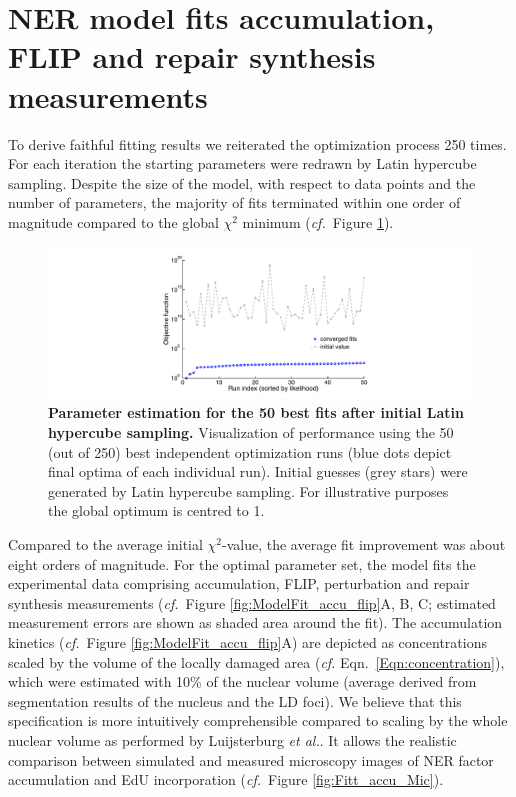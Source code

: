 \newpage



\section{NER model fits accumulation, FLIP and repair synthesis measurements}    

To derive faithful fitting results we reiterated the optimization process 250 times. For each iteration the starting parameters were redrawn by Latin hypercube sampling. Despite the size of the model, with respect to data points and the number of parameters, the majority of fits terminated within one order of magnitude compared to the global $\chi^{2}$ minimum (\textit{cf.}\ Figure \ref{fig:LHS}).
\begin{figure}[b!]
	\begin{center}
		\includegraphics[width=1\textwidth]{Abbildungen/figure2_6_4.pdf}
		\caption{\textbf{Parameter estimation for the 50 best fits after initial Latin hypercube sampling.} Visualization of performance using the 50 (out of 250) best independent optimization runs (blue dots depict final optima of each individual run). Initial guesses (grey stars) were generated by Latin hypercube sampling. For illustrative purposes the global optimum is centred to 1.}
		\label{fig:LHS}
	\end{center}
\end{figure} 

Compared to the average initial $\chi^{2}$-value, the average fit improvement was about eight orders of magnitude. For the optimal parameter set, the model fits the experimental data comprising accumulation, FLIP, perturbation and repair synthesis measurements (\textit{cf.}\ Figure \ref{fig:ModelFit_accu_flip}A, B, C; estimated measurement errors are shown as shaded area around the fit). The accumulation kinetics (\textit{cf.}\ Figure \ref{fig:ModelFit_accu_flip}A) are depicted as concentrations scaled by the volume of the locally damaged area (\textit{cf.} Eqn.\ \ref{Eqn:concentration}), which were estimated with 10\% \label{sec:LD_volume} of the nuclear volume (average derived from segmentation results of the nucleus and the LD foci). We believe that this specification is more intuitively comprehensible  compared to scaling by the whole nuclear volume as performed by Luijsterburg \textit{et al.}\cite{Luijsterburg2010}. It allows the realistic comparison between simulated and measured microscopy images of NER factor accumulation and EdU incorporation (\textit{cf.}\ Figure \ref{fig:Fitt_accu_Mic}).  

